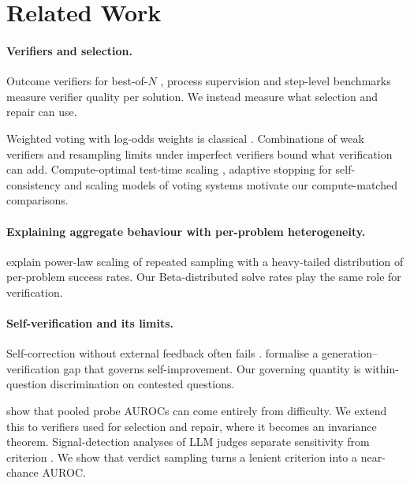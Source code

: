 \documentclass[11pt]{article}
\begin{document}






\section{Related Work}
\label{sec:related}

\paragraph{Verifiers and selection.}
Outcome verifiers for best-of-$N$ \citep{cobbe2021gsm8k}, process supervision \citep{lightman2023verify} and step-level
benchmarks \citep{zheng2025processbench} measure verifier quality per solution. We instead measure what selection and
repair can use.

Weighted voting with log-odds weights is classical \citep{nitzan1982optimal,berend2014consistency}. Combinations of
weak verifiers \citep{saadfalcon2025weaver} and resampling limits under imperfect verifiers \citep{stroebl2026limits}
bound what verification can add. Compute-optimal test-time scaling \citep{snell2024scaling}, adaptive stopping for
self-consistency \citep{wang2023selfconsistency,aggarwal2023adaptive} and scaling models of voting systems
\citep{chen2024morecalls,brown2024monkeys} motivate our compute-matched comparisons.

\paragraph{Explaining aggregate behaviour with per-problem heterogeneity.}
\citet{schaeffer2025monkeys} explain power-law scaling of repeated sampling with a heavy-tailed distribution of
per-problem success rates. Our Beta-distributed solve rates play the same role for verification.

\paragraph{Self-verification and its limits.}
Self-correction without external feedback often fails \citep{huang2024cannot,stechly2025selfverification}.
\citet{song2025mindthegap} formalise a generation--verification gap that governs self-improvement. Our governing
quantity is within-question discrimination on contested questions.

\citet{bulut2026problem} show that pooled probe AUROCs can come entirely from difficulty. We extend this to verifiers
used for selection and repair, where it becomes an invariance theorem. Signal-detection analyses of LLM judges
separate sensitivity from criterion \citep{sdt2026signal}. We show that verdict sampling turns a lenient criterion into
a near-chance AUROC.
\end{document}
